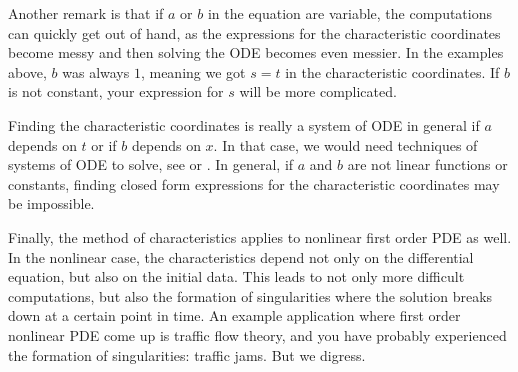 \documentclass{ximera}
\begin{document}
Another remark is that if $a$ or $b$ in the equation are variable, the computations can quickly get out of hand, as the expressions for the characteristic coordinates become messy and then solving the ODE becomes even messier. In the examples above, $b$ was always $1$, meaning we got $s=t$ in the characteristic coordinates.  If $b$ is not constant, your expression for $s$ will be more complicated.

Finding the characteristic coordinates is really a system of ODE in general if $a$ depends on $t$ or if $b$ depends on $x$. In that case, we would need techniques of systems of ODE to solve, see  or .  In general, if $a$ and $b$ are not linear functions or constants, finding closed form expressions for the characteristic coordinates may be impossible.

Finally, the method of characteristics applies to nonlinear first order PDE as well.  In the nonlinear case, the characteristics depend not only on the differential equation, but also on the initial data.  This leads to not only more difficult computations, but also the formation of singularities where the solution breaks down at a certain point in time. An example application where first order nonlinear PDE come up is traffic flow theory, and you have probably experienced the formation of singularities: traffic jams.  But we digress.
\end{document}

